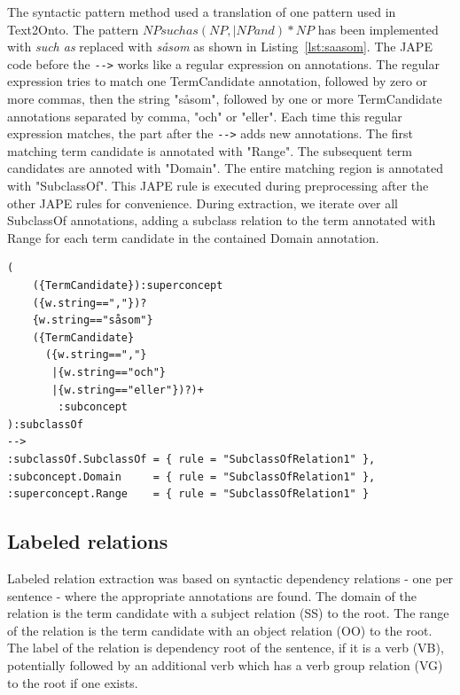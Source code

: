 \documentclass[a4paper]{report}
\begin{document}
The syntactic pattern method used a translation of one pattern used in Text2Onto\cite{Cimiano2005Text2Onto}.
The pattern \(NP such as (NP, |NP and)* NP\) has been implemented with \emph{such as} replaced with \emph{såsom} as shown in Listing~\ref{lst:saasom}.
The JAPE code before the \verb+-->+ works like a regular expression on annotations.
The regular expression tries to match one TermCandidate annotation, followed by zero or more commas, then the string "såsom", followed by one or more TermCandidate annotations separated by comma, "och" or "eller".
Each time this regular expression matches, the part after the \verb+-->+ adds new annotations.
The first matching term candidate is annotated with "Range".
The subsequent term candidates are annoted with "Domain".
The entire matching region is annotated with "SubclassOf".
This JAPE rule is executed during preprocessing after the other JAPE rules for convenience.
During extraction, we iterate over all SubclassOf annotations, adding a subclass relation to the term annotated with Range for each term candidate in the contained Domain annotation.

\begin{Code}
\begin{lstlisting}[frame=single]
(
	({TermCandidate}):superconcept
	({w.string==","})?
	{w.string=="såsom"}
	({TermCandidate}
	  ({w.string==","}
	   |{w.string=="och"}
	   |{w.string=="eller"})?)+
	    :subconcept
):subclassOf
-->
:subclassOf.SubclassOf = { rule = "SubclassOfRelation1" },
:subconcept.Domain     = { rule = "SubclassOfRelation1" },
:superconcept.Range    = { rule = "SubclassOfRelation1" }
\end{lstlisting}
\end{Code}

\subsection{Labeled relations}

Labeled relation extraction was based on syntactic dependency relations - one per sentence - where the appropriate annotations are found.
The domain of the relation is the term candidate with a subject relation (SS) to the root.
The range of the relation is the term candidate with an object relation (OO) to the root.
The label of the relation is dependency root of the sentence, if it is a verb (VB), potentially followed by an additional verb which has a verb group relation (VG) to the root if one exists.
\end{document}

